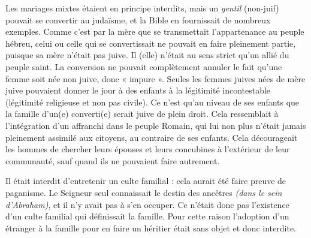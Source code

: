  Les mariages mixtes étaient en principe interdits, mais un \emph{gentil} (non-juif) pouvait se convertir au judaïsme, et la Bible en fournissait de nombreux exemples. Comme c'est par la mère que se transmettait l'appartenance au peuple hébreu, celui ou celle qui se convertissait ne pouvait en faire pleinement partie, puisque sa mère n'était pas juive. Il (elle) n'était au sens strict qu'un allié du peuple saint. La conversion ne pouvait complètement annuler le fait qu'une femme soit née non juive, donc « impure ». Seules les femmes juives nées de mère juive pouvaient donner le jour à des enfants à la légitimité incontestable (légitimité religieuse et non pas civile). Ce n'est qu'au niveau de ses enfants que la famille d'un(e) converti(e) serait juive de plein droit. Cela ressemblait à l'intégration d'un affranchi dans le peuple Romain, qui lui non plus n'était jamais pleinement assimilé aux citoyens, au contraire de ses enfants. Cela décourageait les hommes de chercher leurs épouses et leurs concubines à l'extérieur de leur communauté, sauf quand ils ne pouvaient faire autrement.

 Il était interdit d'entretenir un culte familial : cela aurait été faire preuve de paganisme. Le Seigneur seul connaissait le destin des ancêtres \emph{(dans le sein d'Abraham)}, et il n'y avait pas à s'en occuper. Ce n'était donc pas l'existence d'un culte familial qui définissait la famille. Pour cette raison l'adoption d'un étranger à la famille pour en faire un héritier était sans objet et donc interdite. 

